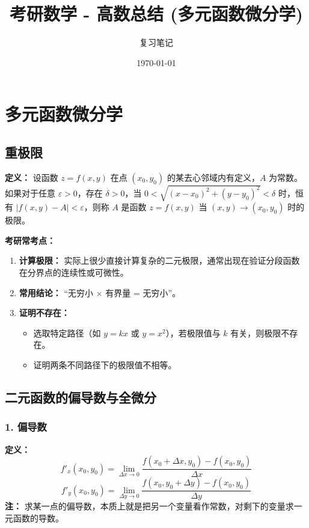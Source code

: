 \documentclass[a4paper,12pt]{ctexart}
\title{\textbf{考研数学 - 高数总结 (多元函数微分学)}}
\author{复习笔记}
\date{\today}
\newenvironment{purplebox}
  {\begin{tcolorbox}[colback=white, colframe=boxpurple, boxrule=1pt, sharp corners, title=\textbf{定义/定理}]}
  {\end{tcolorbox}}
\newenvironment{rednote}
  {\begin{tcolorbox}[colback=notepurple, colframe=highlightred, boxrule=1pt, title=\textbf{重点/考研技巧}]}
  {\end{tcolorbox}}
\begin{document}
\maketitle
\tableofcontents
\newpage

\section{多元函数微分学}

\subsection{重极限}

\begin{purplebox}
    \textbf{定义：} 设函数 $z=f(x,y)$ 在点 $(x_0,y_0)$ 的某去心邻域内有定义，$A$ 为常数。
    如果对于任意 $\varepsilon > 0$，存在 $\delta > 0$，当 $0 < \sqrt{(x-x_0)^2+(y-y_0)^2} < \delta$ 时，恒有 $|f(x,y) - A| < \varepsilon$，则称 $A$ 是函数 $z=f(x,y)$ 当 $(x,y) \to (x_0,y_0)$ 时的极限。
\end{purplebox}

\begin{rednote}
    \textbf{考研常考点：}
    \begin{enumerate}
        \item \textbf{计算极限：} 实际上很少直接计算复杂的二元极限，通常出现在验证分段函数在分界点的连续性或可微性。
        \item \textbf{常用结论：} “无穷小 $\times$ 有界量 = 无穷小”。
        \item \textbf{证明不存在：}
        \begin{itemize}
            \item 选取特定路径（如 $y=kx$ 或 $y=x^2$），若极限值与 $k$ 有关，则极限不存在。
            \item 证明两条不同路径下的极限值不相等。
        \end{itemize}
    \end{enumerate}
\end{rednote}

\subsection{二元函数的偏导数与全微分}

\subsubsection{1. 偏导数}
\textbf{定义：}
\[ f'_x(x_0,y_0) = \lim_{\Delta x \to 0} \frac{f(x_0+\Delta x, y_0) - f(x_0,y_0)}{\Delta x} \]
\[ f'_y(x_0,y_0) = \lim_{\Delta y \to 0} \frac{f(x_0, y_0+\Delta y) - f(x_0,y_0)}{\Delta y} \]
\textbf{注：} 求某一点的偏导数，本质上就是把另一个变量看作常数，对剩下的变量求一元函数的导数。
\end{document}
